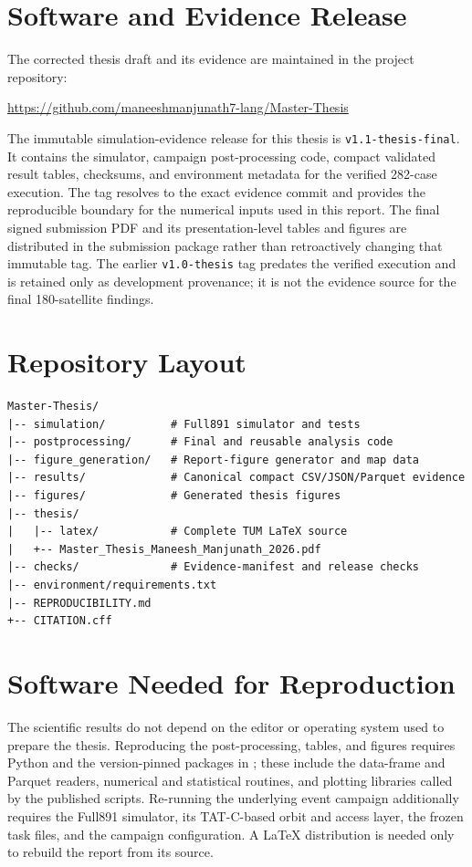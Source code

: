 \section{Software and Evidence Release}

The corrected thesis draft and its evidence are maintained in the project repository:

\begin{center}
\url{https://github.com/maneeshmanjunath7-lang/Master-Thesis}
\end{center}

The immutable simulation-evidence release for this thesis is \texttt{v1.1-thesis-final}. It contains the simulator, campaign post-processing code, compact validated result tables, checksums, and environment metadata for the verified 282-case execution. The tag resolves to the exact evidence commit and provides the reproducible boundary for the numerical inputs used in this report. The final signed submission PDF and its presentation-level tables and figures are distributed in the submission package rather than retroactively changing that immutable tag. The earlier \texttt{v1.0-thesis} tag predates the verified execution and is retained only as development provenance; it is not the evidence source for the final 180-satellite findings.

\section{Repository Layout}

\begin{lstlisting}
Master-Thesis/
|-- simulation/          # Full891 simulator and tests
|-- postprocessing/      # Final and reusable analysis code
|-- figure_generation/   # Report-figure generator and map data
|-- results/             # Canonical compact CSV/JSON/Parquet evidence
|-- figures/             # Generated thesis figures
|-- thesis/
|   |-- latex/           # Complete TUM LaTeX source
|   +-- Master_Thesis_Maneesh_Manjunath_2026.pdf
|-- checks/              # Evidence-manifest and release checks
|-- environment/requirements.txt
|-- REPRODUCIBILITY.md
+-- CITATION.cff
\end{lstlisting}

\section{Software Needed for Reproduction}

The scientific results do not depend on the editor or operating system used to prepare the thesis. Reproducing the post-processing, tables, and figures requires Python and the version-pinned packages in ; these include the data-frame and Parquet readers, numerical and statistical routines, and plotting libraries called by the published scripts. Re-running the underlying event campaign additionally requires the Full891 simulator, its TAT-C-based orbit and access layer, the frozen task files, and the campaign configuration. A LaTeX distribution is needed only to rebuild the report from its source.

